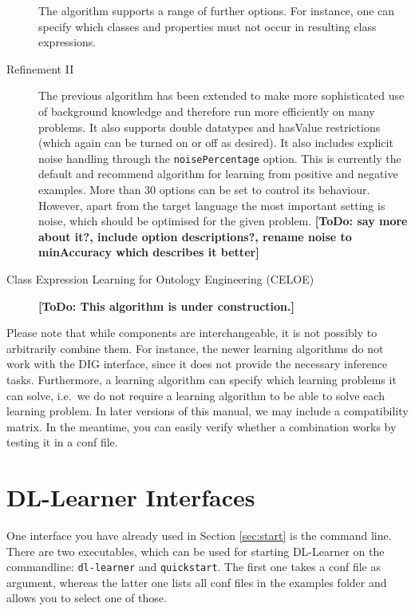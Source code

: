 \documentclass[a4paper,12pt]{scrartcl}
\newcommand{\todo}[1]{\textbf{[ToDo: #1]}}
\begin{document}
\begin{description}
\begin{itemize}
 \end{itemize}
  The algorithm supports a range of further options. For instance, one can specify which classes and properties must not occur in resulting class expressions.
 \item[Refinement II] The previous algorithm has been extended to make more sophisticated use of background knowledge and therefore run more efficiently on many problems. It also supports double datatypes and hasValue restrictions (which again can be turned on or off as desired). It also includes explicit noise handling through the \verb|noisePercentage| option. This is currently the default and recommend algorithm for learning from positive and negative examples. More than 30 options can be set to control its behaviour. However, apart from the target language the most important setting is noise, which should be optimised for the given problem. \todo{say more about it?, include option descriptions?, rename noise to minAccuracy which describes it better}
 \item[Class Expression Learning for Ontology Engineering (CELOE)] \todo{This algorithm is under construction.}
\end{description}

Please note that while components are interchangeable, it is not possibly to arbitrarily combine them. For instance, the newer learning algorithms do not work with the DIG interface, since it does not provide the necessary inference tasks. Furthermore, a learning algorithm can specify which learning problems it can solve, i.e.~we do not require a learning algorithm to be able to solve each learning problem. In later versions of this manual, we may include a compatibility matrix. In the meantime, you can easily verify whether a combination works by testing it in a conf file.

\section{DL-Learner Interfaces}

One interface you have already used in Section \ref{sec:start} is the command line. There are two executables, which can be used for starting DL-Learner on the commandline: \verb|dl-learner| and \verb|quickstart|. The first one takes a conf file as argument, whereas the latter one lists all conf files in the examples folder and allows you to select one of those.
\end{document}
